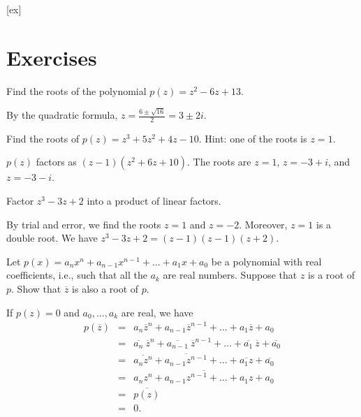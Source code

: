 [ex]
\section*{Exercises}

\begin{enumialphparenastyle}

\begin{ex}
  Find the roots of the polynomial $p(z) = z^2-6z+13$.
  \begin{sol}
    By the quadratic formula, $\displaystyle z=\frac{6\pm\sqrt{16}}{2}
      = 3\pm 2i$.    
  \end{sol}
\end{ex}

\begin{ex}
  Find the roots of $p(z) = z^3 + 5z^2 + 4z - 10$. Hint: one of the
  roots is $z=1$.
  \begin{sol}
    $p(z)$ factors as $(z-1)(z^2+6z+10)$. The roots are $z=1$,
    $z=-3+i$, and $z=-3-i$.
  \end{sol}
\end{ex}

\begin{ex}
  Factor $z^3 - 3z + 2$ into a product of linear factors.
  \begin{sol}
    By trial and error, we find the roots $z=1$ and $z=-2$. Moreover,
    $z=1$ is a double root. We have $z^3 - 3z + 2 = (z-1)(z-1)(z+2)$.
  \end{sol}
\end{ex}

\begin{ex}
  Let $p(x) =a_{n}x^{n}+a_{n-1}x^{n-1}+\ldots+a_{1}x+a_{0}$ be a
  polynomial with real coefficients, i.e., such that all the $a_{k}$
  are real numbers. Suppose that $z$ is a root of $p$. Show that
  $\overline{z}$ is also a root of $p$. 
  \begin{sol}
    If $p(z) =0$ and $a_0,\ldots,a_k$ are real, we have
    \begin{eqnarray*}
      p(\overline{z})
      &=& a_{n}\overline{z}^{n}+a_{n-1}\overline{z}^{n-1}+\ldots +a_{1}\overline{z}          
          +a_{0} \\
      &=&\overline{a_{n}}\ \overline{z}^{n}+\overline{a_{n-1}}\ \overline{z}                
      ^{n-1}+\ldots +\overline{a_{1}}\ \overline{z}+\overline{a_{0}}
      \\
      &=& \overline{a_{n}z^{n}}+\overline{a_{n-1}z^{n-1}}+\ldots +\overline{a_{1}z}+         
          \overline{a_{0}} \\
      &=& \overline{a_{n}z^{n}+a_{n-1}z^{n-1}+\ldots+a_{1}z+a_{0}} \\
      &=& \overline{p(z) } \\
      &=& 0.
    \end{eqnarray*}
  \end{sol}
\end{ex}

\end{enumialphparenastyle}
